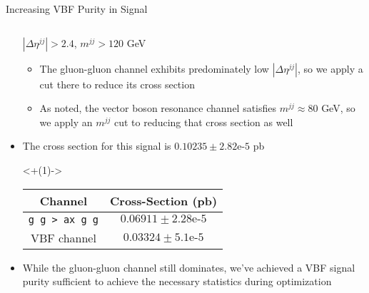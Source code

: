 \documentclass[handout]{beamer}
\begin{document}
\begin{frame}{Increasing VBF Purity in Signal}
\begin{columns}
\begin{column}{0.45\linewidth}
\begin{block}
\begin{itemize}[<+(1)->]
                    $|\Delta \eta^{jj}| > 2.4$, $m^{jj} > 120$ GeV
                    \begin{itemize}[<+(1)->]
                        \item The gluon-gluon channel exhibits predominately low $|\Delta \eta^{jj}|$, so we apply a cut there to reduce its cross section
                        \item As noted, the vector boson resonance channel satisfies $m^{jj} \approx 80$ GeV, so we apply an $m^{jj}$ cut to reducing that cross section as well
                    \end{itemize}
                    \item The cross section for this signal is $0.10235 \pm 2.82\text{e-}5$ pb
                    \begin{center}
                        \uncover<+(1)->{
                            \begin{tabular}{|c|c|}
                                \hline
                                Channel & Cross-Section (pb) \\
                                \hline
                                \hline
                                \texttt{g g > ax g g} & $0.06911 \pm 2.28\text{e-}5$\\
                                VBF channel & $0.03324 \pm 5.1\text{e-}5$\\
                                \hline
                            \end{tabular}
                        }
                    \end{center}
                    \item While the gluon-gluon channel still dominates, we've achieved a VBF signal purity sufficient to achieve the necessary statistics during optimization 
                \end{itemize}
            \end{block}
        \end{column}
    \end{columns}
\end{frame}
\end{document}
